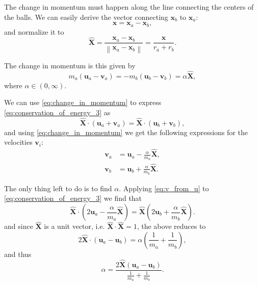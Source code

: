 \documentclass{article}
\renewcommand{\vec}[1]{\bm{#1}}
\newcommand{\bhat}[1]{\bm{\hat{#1}}}
\begin{document}
\begin{enumerate}
        The change in momentum must happen along the line connecting the centers of the balls. We can easily derive the vector connecting $\vec{x}_{b}$ to $\vec{x}_{a}$:
        \begin{equation}
            \vec{x} = \vec{x}_{a}-\vec{x}_{b},
            \label{eq:connect_x1_x2}
        \end{equation}
        and normalize it to
        \begin{equation}
            \bhat{X} = \frac{\vec{x}_{a}-\vec{x}_{b}}{\left\|\vec{x}_{a}-\vec{x}_{b} \right\|} = \frac{\vec{x}}{r_{a}+r_{b}}.
            \label{eq:unit_connect_x1_x2}
        \end{equation}

        The change in momentum is this given by
        \begin{equation}
            m_{a}\left( \vec{u}_{a}-\vec{v}_{a} \right) = -m_{b}\left( \vec{u}_{b}-\vec{v}_{b} \right) = \alpha\bhat{X},
            \label{eq:change_in_momentum}
        \end{equation}
        where $\alpha\in\left(0, \infty\right)$.

        We can use \autoref{eq:change_in_momentum} to express \autoref{eq:conservation_of_energy_3} as
        \begin{equation}
            \bhat{X}\cdot\left(\vec{u}_{a}+\vec{v}_{a}\right) = \bhat{X}\cdot\left(\vec{u}_{b}+\vec{v}_{b}\right),
            \label{eq:label}
        \end{equation}
        and using \autoref{eq:change_in_momentum} we get the following expressions for the velocities $\vec{v}_{i}$:
        \begin{align}
            \vec{v}_{a} &= \vec{u}_{a} - \frac{\alpha}{m_{a}}\bhat{X},\nonumber\\
            \vec{v}_{b} &= \vec{u}_{b} + \frac{\alpha}{m_{b}}\bhat{X}.
            \label{eq:v_from_u}
        \end{align}

        The only thing left to do is to find $\alpha$. Applying \autoref{eq:v_from_u} to \autoref{eq:conservation_of_energy_3} we find that
        \begin{equation}
            \bhat{X}\cdot\left(2\vec{u}_{a}-\frac{\alpha}{m_{a}}\bhat{X}\right) = \bhat{X}\left(2\vec{u}_{b}+\frac{\alpha}{m_{b}}\bhat{X}\right).
            \label{eq:find_alpha}
        \end{equation}
        and since $\bhat{X}$ is a unit vector, i.e. $\bhat{X}\cdot\bhat{X}=1$, the above reduces to
        \begin{equation}
        2\bhat{X}\cdot\left(\vec{u}_{a}-\vec{u}_{b}\right) = \alpha\left(\frac{1}{m_{a}}+\frac{1}{m_{b}}\right),
            \label{eq:reduction_1}
        \end{equation}
        and thus
        \begin{equation}
        \alpha = \frac{2\bhat{X}\left(\vec{u}_{a}-\vec{u}_{b}\right)}{\frac{1}{m_{a}}+\frac{1}{m_{b}}}.
            \label{eq:reduction_2}
        \end{equation}


\end{enumerate}
\end{document}
